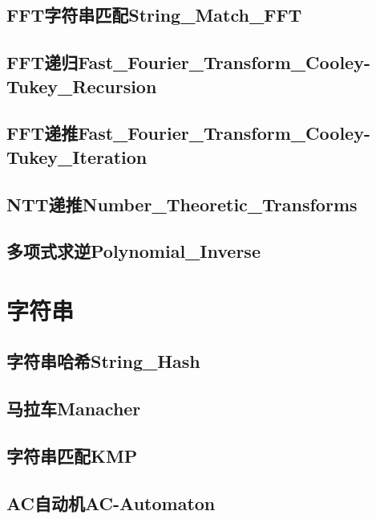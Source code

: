 \documentclass[10pt,a4paper]{article}
\begin{document}
\subsection{FFT字符串匹配String\_Match\_FFT}

\subsection{FFT递归Fast\_Fourier\_Transform\_Cooley-Tukey\_Recursion}

\subsection{FFT递推Fast\_Fourier\_Transform\_Cooley-Tukey\_Iteration}

\subsection{NTT递推Number\_Theoretic\_Transforms}

\subsection{多项式求逆Polynomial\_Inverse}


\newpage
\section{字符串}
\subsection{字符串哈希String\_Hash}

\subsection{马拉车Manacher}

\subsection{字符串匹配KMP}

\subsection{AC自动机AC-Automaton}

\end{document}
